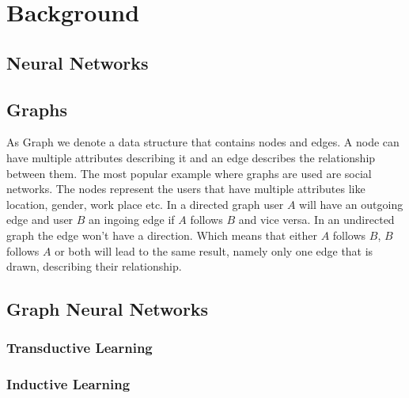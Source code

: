 \chapter{Background}

  \section{Neural Networks}

	\section{Graphs}

		As Graph we denote a data structure that contains nodes and edges. A node can have multiple attributes describing it and an edge describes the relationship between them. The most popular example where graphs are used are social networks. The nodes represent the users that have multiple attributes like location, gender, work place etc. In a directed graph user $A$ will have an outgoing edge and user $B$ an ingoing edge if $A$ follows $B$ and vice versa. In an undirected graph the edge won't have a direction. Which means that either $A$ follows $B$, $B$ follows $A$ or both will lead to the same result, namely only one edge that is drawn, describing their relationship.

	\section{Graph Neural Networks}

    \subsection{Transductive Learning}

    \subsection{Inductive Learning}
